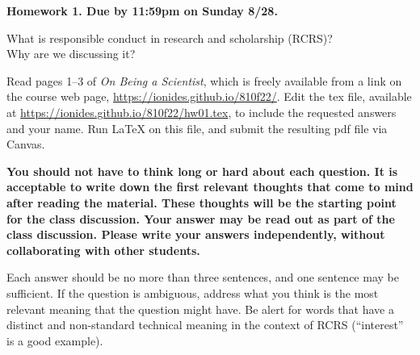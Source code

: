 \documentclass[12pt]{article}
\begin{document}
\begin{center}\bf 
Homework 1. Due by 11:59pm on Sunday 8/28.

What is responsible conduct in research and scholarship (RCRS)? \\
Why are we discussing it? 
\end{center}

Read pages 1--3 of {\em On Being a Scientist}, which is freely available from a link on the course web page, \url{https://ionides.github.io/810f22/}. Edit the tex file, available at \url{https://ionides.github.io/810f22/hw01.tex}, to include the requested answers and your name. Run {\LaTeX} on this file, and submit the resulting pdf file via Canvas.

{\bf You should not have to think long or hard about each question. It is acceptable to write down the first relevant thoughts that come to mind after reading the material. These thoughts will be the starting point for the class discussion. Your answer may be read out as part of the class discussion. Please write your answers independently, without collaborating with other students.

Each answer should be no more than three sentences, and one sentence may be sufficient. If the question is ambiguous, address what you think is the most relevant meaning that the question might have. Be alert for words that have a distinct and non-standard technical meaning in the context of RCRS (``interest'' is a good example).

}
\end{document}
